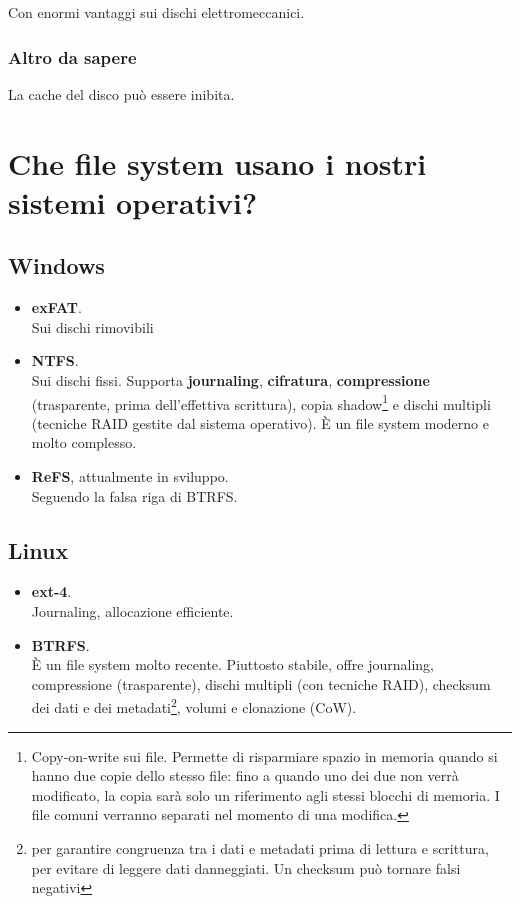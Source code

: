 \documentclass{report}
\begin{document}
Con enormi vantaggi sui dischi elettromeccanici.

\subsubsection{Altro da sapere}
La cache del disco può essere inibita.

\newpage

\section{Che file system usano i nostri sistemi operativi?}

\subsection{Windows}
\begin{itemize}
    \item \textbf{exFAT}.\\
    Sui dischi rimovibili
    
    \item \textbf{NTFS}.\\
    Sui dischi fissi. Supporta \textbf{journaling}, \textbf{cifratura}, \textbf{compressione} (trasparente, prima dell'effettiva scrittura), copia shadow\footnote{Copy-on-write sui file. Permette di risparmiare spazio in memoria quando si hanno due copie dello stesso file: fino a quando uno dei due non verrà modificato, la copia sarà solo un riferimento agli stessi blocchi di memoria. I file comuni verranno separati nel momento di una modifica.} e dischi multipli (tecniche RAID gestite dal sistema operativo). È un file system moderno e molto complesso.

    \item \textbf{ReFS}, attualmente in sviluppo.\\
    Seguendo la falsa riga di BTRFS.
\end{itemize}

\subsection{Linux}

\begin{itemize}
    \item \textbf{ext-4}.\\
    Journaling, allocazione efficiente.
    
    \item \textbf{BTRFS}.\\
    È un file system molto recente. Piuttosto stabile, offre journaling, compressione (trasparente), dischi multipli (con tecniche RAID), checksum dei dati e dei metadati\footnote{per garantire congruenza tra i dati e metadati prima di lettura e scrittura, per evitare di leggere dati danneggiati. Un checksum può tornare falsi negativi}, volumi e clonazione (CoW).
\end{itemize}
\end{document}
